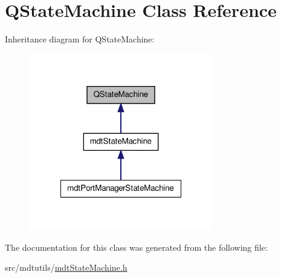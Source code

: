 \hypertarget{class_q_state_machine}{\section{Q\-State\-Machine Class Reference}
\label{class_q_state_machine}
}


Inheritance diagram for Q\-State\-Machine\-:
\nopagebreak
\begin{figure}[H]
\begin{center}
\leavevmode
\includegraphics[width=228pt]{class_q_state_machine__inherit__graph}
\end{center}
\end{figure}


The documentation for this class was generated from the following file\-:\begin{DoxyCompactItemize}
\item 
src/mdtutils/\hyperlink{mdt_state_machine_8h}{mdt\-State\-Machine.\-h}\end{DoxyCompactItemize}

